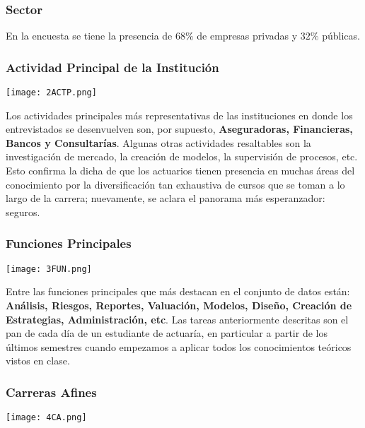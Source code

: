 \documentclass{article}
\begin{document}
\subsubsection{Sector}

En la encuesta se tiene la presencia de $68\%$ de empresas privadas y $32\%$ públicas.

\subsubsection{Actividad Principal de la Institución}

\begin{center}
    \texttt{[image: 2ACTP.png]}
\end{center}

Los actividades principales más representativas de las instituciones en donde los entrevistados se desenvuelven son, por supuesto, \textbf{Aseguradoras, Financieras, Bancos y Consultarías}. Algunas otras actividades resaltables son la investigación de mercado, la creación de modelos, la supervisión de procesos, etc. Esto confirma la dicha de que los actuarios tienen presencia en muchas áreas del conocimiento por la diversificación tan exhaustiva de cursos que se toman a lo largo de la carrera; nuevamente, se aclara el panorama más esperanzador: seguros. 


\subsubsection{Funciones Principales}

\begin{center}
    \texttt{[image: 3FUN.png]}
\end{center}

Entre las funciones principales que más destacan en el conjunto de datos están: \textbf{Análisis, Riesgos, Reportes, Valuación, Modelos, Diseño, Creación de Estrategias, Administración, etc}. Las tareas anteriormente descritas son el pan de cada día de un estudiante de actuaría, en particular a partir de los últimos semestres cuando empezamos a aplicar todos los conocimientos teóricos vistos en clase. 

\subsubsection{Carreras Afines}

\begin{center}
    \texttt{[image: 4CA.png]}
\end{center}
\end{document}
